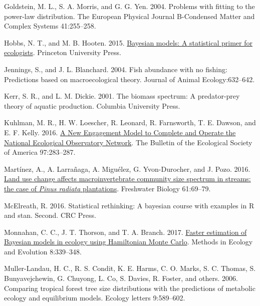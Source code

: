 \documentclass[
  12pt,
]{article}
\newlength{\cslhangindent}
\newlength{\cslentryspacingunit} %
\newenvironment{CSLReferences}[2] %
 {%
  \setlength{\parindent}{0pt}
  \ifodd #1
  \let\oldpar\par
  \def\par{\hangindent=\cslhangindent\oldpar}
  \fi
  \setlength{\parskip}{#2\cslentryspacingunit}
 }%
 {}
\numberwithin{equation}
\begin{document}
\begin{CSLReferences}{1}{0}
\leavevmode{}%
Goldstein, M. L., S. A. Morris, and G. G. Yen. 2004. Problems with
fitting to the power-law distribution. The European Physical Journal
B-Condensed Matter and Complex Systems 41:255--258.

\leavevmode{}%
Hobbs, N. T., and M. B. Hooten. 2015.
\href{https://doi.org/10.23943/princeton/9780691159287.001.0001}{Bayesian
models: {A} statistical primer for ecologists}. {Princeton University
Press}.

\leavevmode{}%
Jennings, S., and J. L. Blanchard. 2004. Fish abundance with no fishing:
Predictions based on macroecological theory. Journal of Animal
Ecology:632--642.

\leavevmode{}%
Kerr, S. R., and L. M. Dickie. 2001. The biomass spectrum: {A}
predator-prey theory of aquatic production. {Columbia University Press}.

\leavevmode{}%
Kuhlman, M. R., H. W. Loescher, R. Leonard, R. Farnsworth, T. E. Dawson,
and E. F. Kelly. 2016. \href{https://doi.org/10.1002/bes2.1248}{A {New
Engagement Model} to {Complete} and {Operate} the {National Ecological
Observatory Network}}. The Bulletin of the Ecological Society of America
97:283--287.

\leavevmode{}%
Martínez, A., A. Larrañaga, A. Miguélez, G. Yvon-Durocher, and J. Pozo.
2016. \href{https://doi.org/10.1111/fwb.12680}{Land use change affects
macroinvertebrate community size spectrum in streams: the case of
{\emph{Pinus radiata}} plantations}. Freshwater Biology 61:69--79.

\leavevmode{}%
McElreath, R. 2016. Statistical rethinking: {A} bayesian course with
examples in {R} and stan. Second. {CRC Press}.

\leavevmode{}%
Monnahan, C. C., J. T. Thorson, and T. A. Branch. 2017.
\href{https://doi.org/10.1111/2041-210X.12681}{Faster estimation of
{Bayesian} models in ecology using {Hamiltonian Monte Carlo}}. Methods
in Ecology and Evolution 8:339--348.

\leavevmode{}%
Muller-Landau, H. C., R. S. Condit, K. E. Harms, C. O. Marks, S. C.
Thomas, S. Bunyavejchewin, G. Chuyong, L. Co, S. Davies, R. Foster, and
others. 2006. Comparing tropical forest tree size distributions with the
predictions of metabolic ecology and equilibrium models. Ecology letters
9:589--602.


\end{CSLReferences}
\end{document}
